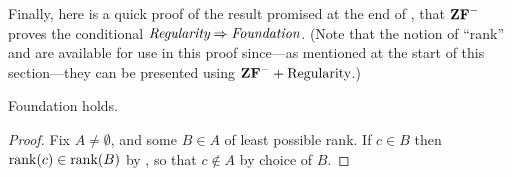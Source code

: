\documentclass[../../../include/open-logic-section]{subfiles}
\begin{document}
Finally, here is a quick proof of the result promised at the end of
, that $\mathbf{ZF}^{-}$ proves the conditional
$\emph{Regularity} \Rightarrow \emph{Foundation}$. (Note that the
notion of ``rank'' and  are available for use
in this proof since---as mentioned at the start of this section---they
can be presented using $\mathbf{ZF}^{-} + \text{Regularity}$.)

\begin{prop} Foundation holds.
\end{prop}

\begin{proof}
Fix $A \neq \emptyset$, and some $B \in A$ of least possible rank. If
$c \in B$ then $\mathrm{rank}(c) \in \mathrm{rank}(B)$ by
, so that $c \notin A$ by choice of $B$.
\end{proof}
\end{document}

